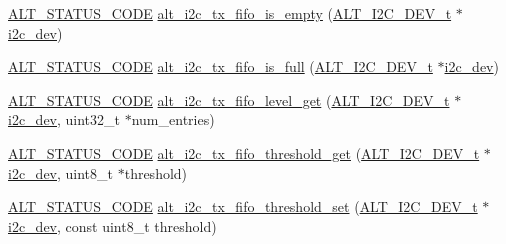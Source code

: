 \begin{DoxyCompactItemize}
\item 
\mbox{\hyperlink{hwlib_8h_abdb0d369f069723ca55d6c94bcaaaa12}{A\+L\+T\+\_\+\+S\+T\+A\+T\+U\+S\+\_\+\+C\+O\+DE}} \mbox{\hyperlink{group__ALT__I2C__TX__FIFO_gad05ec1e8cc6ad14170154fb6ceac7bc6}{alt\+\_\+i2c\+\_\+tx\+\_\+fifo\+\_\+is\+\_\+empty}} (\mbox{\hyperlink{structALT__I2C__DEV__s}{A\+L\+T\+\_\+\+I2\+C\+\_\+\+D\+E\+V\+\_\+t}} $\ast$\mbox{\hyperlink{structi2c__dev}{i2c\+\_\+dev}})
\item 
\mbox{\hyperlink{hwlib_8h_abdb0d369f069723ca55d6c94bcaaaa12}{A\+L\+T\+\_\+\+S\+T\+A\+T\+U\+S\+\_\+\+C\+O\+DE}} \mbox{\hyperlink{group__ALT__I2C__TX__FIFO_ga741f705473ce5cb1c2859f91c1dc3f6b}{alt\+\_\+i2c\+\_\+tx\+\_\+fifo\+\_\+is\+\_\+full}} (\mbox{\hyperlink{structALT__I2C__DEV__s}{A\+L\+T\+\_\+\+I2\+C\+\_\+\+D\+E\+V\+\_\+t}} $\ast$\mbox{\hyperlink{structi2c__dev}{i2c\+\_\+dev}})
\item 
\mbox{\hyperlink{hwlib_8h_abdb0d369f069723ca55d6c94bcaaaa12}{A\+L\+T\+\_\+\+S\+T\+A\+T\+U\+S\+\_\+\+C\+O\+DE}} \mbox{\hyperlink{group__ALT__I2C__TX__FIFO_ga933113da14d91a6276239c233e123572}{alt\+\_\+i2c\+\_\+tx\+\_\+fifo\+\_\+level\+\_\+get}} (\mbox{\hyperlink{structALT__I2C__DEV__s}{A\+L\+T\+\_\+\+I2\+C\+\_\+\+D\+E\+V\+\_\+t}} $\ast$\mbox{\hyperlink{structi2c__dev}{i2c\+\_\+dev}}, uint32\+\_\+t $\ast$num\+\_\+entries)
\item 
\mbox{\hyperlink{hwlib_8h_abdb0d369f069723ca55d6c94bcaaaa12}{A\+L\+T\+\_\+\+S\+T\+A\+T\+U\+S\+\_\+\+C\+O\+DE}} \mbox{\hyperlink{group__ALT__I2C__TX__FIFO_gad72ef4aff5f1ee4e1f35aa525a4f04c2}{alt\+\_\+i2c\+\_\+tx\+\_\+fifo\+\_\+threshold\+\_\+get}} (\mbox{\hyperlink{structALT__I2C__DEV__s}{A\+L\+T\+\_\+\+I2\+C\+\_\+\+D\+E\+V\+\_\+t}} $\ast$\mbox{\hyperlink{structi2c__dev}{i2c\+\_\+dev}}, uint8\+\_\+t $\ast$threshold)
\item 
\mbox{\hyperlink{hwlib_8h_abdb0d369f069723ca55d6c94bcaaaa12}{A\+L\+T\+\_\+\+S\+T\+A\+T\+U\+S\+\_\+\+C\+O\+DE}} \mbox{\hyperlink{group__ALT__I2C__TX__FIFO_ga586c10f3131294a2d8a20b8698277279}{alt\+\_\+i2c\+\_\+tx\+\_\+fifo\+\_\+threshold\+\_\+set}} (\mbox{\hyperlink{structALT__I2C__DEV__s}{A\+L\+T\+\_\+\+I2\+C\+\_\+\+D\+E\+V\+\_\+t}} $\ast$\mbox{\hyperlink{structi2c__dev}{i2c\+\_\+dev}}, const uint8\+\_\+t threshold)
\end{DoxyCompactItemize}


